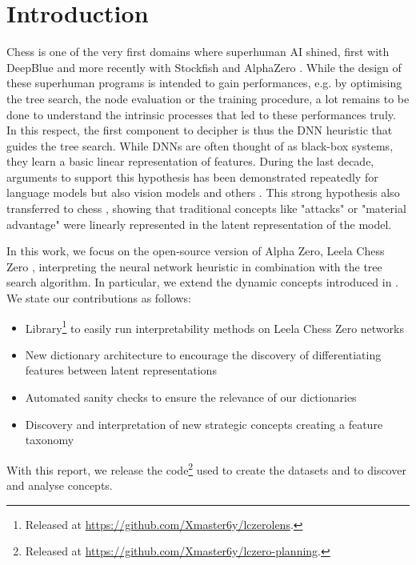 \section{Introduction}

Chess is one of the very first domains where superhuman AI shined, first with DeepBlue \cite{campbell2002deep} and more recently with Stockfish \cite{nasu2018nnue} and AlphaZero \cite{silver2018general}. While the design of these superhuman programs is intended to gain performances, e.g. by optimising the tree search, the node evaluation or the training procedure, a lot remains to be done to understand the intrinsic processes that led to these performances truly. In this respect, the first component to decipher is thus the DNN heuristic that guides the tree search. While DNNs are often thought of as black-box systems, they learn a basic linear representation of features. During the last decade, arguments to support this hypothesis has been demonstrated repeatedly for language models \cite{Mikolov2013LinguisticRI, Burns2022DiscoveringLK,Tigges2023LinearRO} but also vision models \cite{Radford2015UnsupervisedRL,Kim2017InterpretabilityBF,Trager2023LinearSO} and others \cite{Nanda2023EmergentLR,Rajendran2024LearningIC}. This strong hypothesis also transferred to chess \cite{McGrath2022Acquisition}, showing that traditional concepts like "attacks" or "material advantage" were linearly represented in the latent representation of the model.


 In this work, we focus on the open-source version of Alpha Zero, Leela Chess Zero \cite{pascutto2019leela}, interpreting the neural network heuristic in combination with the tree search algorithm. In particular, we extend the dynamic concepts introduced in \cite{schut2023bridging}.
We state our contributions as follows:
\begin{itemize}
    \item Library\footnote{
Released at \href{https://github.com/Xmaster6y/lczerolens}{https://github.com/Xmaster6y/lczerolens}.
}
    to easily run interpretability methods on Leela Chess Zero networks
    \item New dictionary architecture to encourage the discovery of differentiating features between latent representations
    \item Automated sanity checks to ensure the relevance of our dictionaries
    \item Discovery and interpretation of new strategic concepts creating a feature taxonomy
\end{itemize}

With this report, we release the code\footnote{
Released at \href{https://github.com/Xmaster6y/lczero-planning}{https://github.com/Xmaster6y/lczero-planning}.
} used to create the datasets and to discover and analyse concepts.
